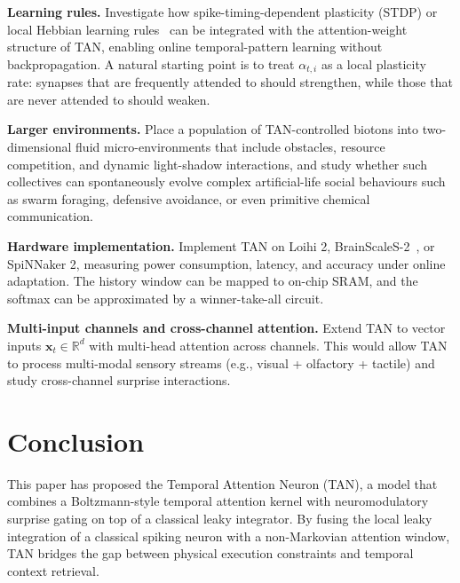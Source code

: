 \textbf{Learning rules.} Investigate how spike-timing-dependent plasticity (STDP) or local Hebbian learning rules~\cite{bi1998} can be integrated with the attention-weight structure of TAN, enabling online temporal-pattern learning without backpropagation. A natural starting point is to treat $\alpha_{t,i}$ as a local plasticity rate: synapses that are frequently attended to should strengthen, while those that are never attended to should weaken.

\textbf{Larger environments.} Place a population of TAN-controlled biotons into two-dimensional fluid micro-environments that include obstacles, resource competition, and dynamic light-shadow interactions, and study whether such collectives can spontaneously evolve complex artificial-life social behaviours such as swarm foraging, defensive avoidance, or even primitive chemical communication.

\textbf{Hardware implementation.} Implement TAN on Loihi 2, BrainScaleS-2~\cite{pehle2022}, or SpiNNaker 2, measuring power consumption, latency, and accuracy under online adaptation. The history window can be mapped to on-chip SRAM, and the softmax can be approximated by a winner-take-all circuit.

\textbf{Multi-input channels and cross-channel attention.} Extend TAN to vector inputs $\mathbf{x}_t \in \mathbb{R}^d$ with multi-head attention across channels. This would allow TAN to process multi-modal sensory streams (e.g., visual + olfactory + tactile) and study cross-channel surprise interactions.

\section{Conclusion}\label{sec:conclusion}

This paper has proposed the Temporal Attention Neuron (TAN), a model that combines a Boltzmann-style temporal attention kernel with neuromodulatory surprise gating on top of a classical leaky integrator. By fusing the local leaky integration of a classical spiking neuron with a non-Markovian attention window, TAN bridges the gap between physical execution constraints and temporal context retrieval.

